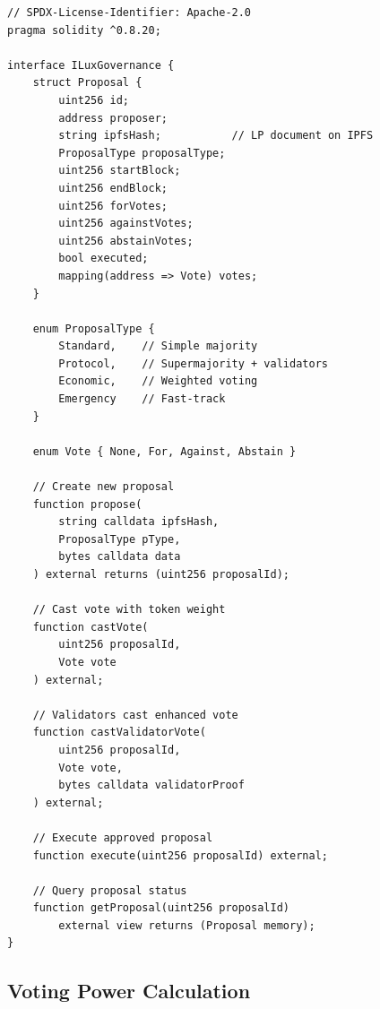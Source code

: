 \documentclass[11pt,a4paper]{article}
\begin{document}
\begin{lstlisting}[language=Solidity,caption=Core governance contract interface]
// SPDX-License-Identifier: Apache-2.0
pragma solidity ^0.8.20;

interface ILuxGovernance {
    struct Proposal {
        uint256 id;
        address proposer;
        string ipfsHash;           // LP document on IPFS
        ProposalType proposalType;
        uint256 startBlock;
        uint256 endBlock;
        uint256 forVotes;
        uint256 againstVotes;
        uint256 abstainVotes;
        bool executed;
        mapping(address => Vote) votes;
    }

    enum ProposalType {
        Standard,    // Simple majority
        Protocol,    // Supermajority + validators
        Economic,    // Weighted voting
        Emergency    // Fast-track
    }

    enum Vote { None, For, Against, Abstain }

    // Create new proposal
    function propose(
        string calldata ipfsHash,
        ProposalType pType,
        bytes calldata data
    ) external returns (uint256 proposalId);

    // Cast vote with token weight
    function castVote(
        uint256 proposalId,
        Vote vote
    ) external;

    // Validators cast enhanced vote
    function castValidatorVote(
        uint256 proposalId,
        Vote vote,
        bytes calldata validatorProof
    ) external;

    // Execute approved proposal
    function execute(uint256 proposalId) external;

    // Query proposal status
    function getProposal(uint256 proposalId)
        external view returns (Proposal memory);
}
\end{lstlisting}

\subsection{Voting Power Calculation}
\end{document}

